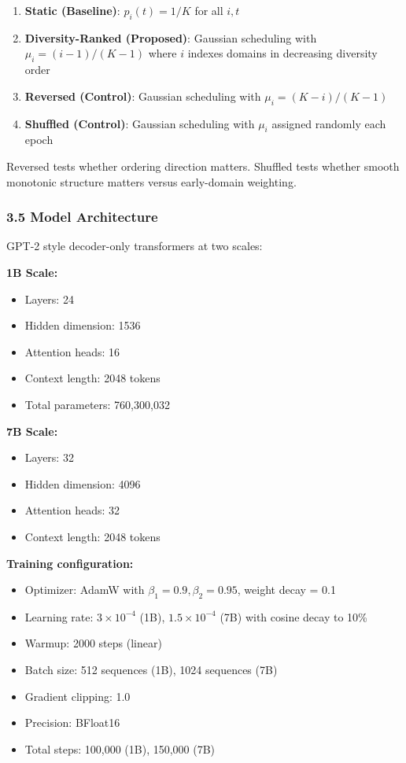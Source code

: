 \begin{enumerate}
\item \textbf{Static (Baseline)}: $p_i(t) = 1/K$ for all $i, t$
\item \textbf{Diversity-Ranked (Proposed)}: Gaussian scheduling with $\mu_i = (i-1)/(K-1)$ where $i$ indexes domains in decreasing diversity order
\item \textbf{Reversed (Control)}: Gaussian scheduling with $\mu_i = (K-i)/(K-1)$
\item \textbf{Shuffled (Control)}: Gaussian scheduling with $\mu_i$ assigned randomly each epoch
\end{enumerate}

Reversed tests whether ordering direction matters. Shuffled tests whether smooth monotonic structure matters versus early-domain weighting.

\subsubsection{3.5 Model Architecture}

GPT-2 style decoder-only transformers at two scales:

\textbf{1B Scale:}
\begin{itemize}
\item Layers: 24
\item Hidden dimension: 1536
\item Attention heads: 16
\item Context length: 2048 tokens
\item Total parameters: 760,300,032
\end{itemize}

\textbf{7B Scale:}
\begin{itemize}
\item Layers: 32
\item Hidden dimension: 4096
\item Attention heads: 32
\item Context length: 2048 tokens
\end{itemize}

\textbf{Training configuration:}
\begin{itemize}
\item Optimizer: AdamW with $\beta_1 = 0.9, \beta_2 = 0.95$, weight decay = 0.1
\item Learning rate: $3 \times 10^{-4}$ (1B), $1.5 \times 10^{-4}$ (7B) with cosine decay to 10\%
\item Warmup: 2000 steps (linear)
\item Batch size: 512 sequences (1B), 1024 sequences (7B)
\item Gradient clipping: 1.0
\item Precision: BFloat16
\item Total steps: 100,000 (1B), 150,000 (7B)
\end{itemize}

